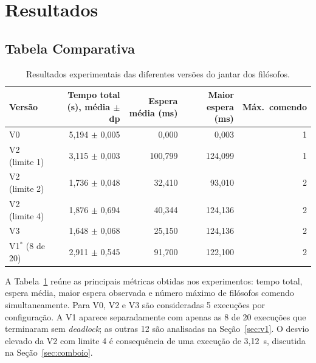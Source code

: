 \documentclass[12pt,brazil,a4paper]{article}
\begin{document}
\section{Resultados}

\subsection{Tabela Comparativa}

\begin{table}[H]
\centering
\small
\begin{tabular}{lrrrr}
\toprule
Versão & Tempo total (s), média $\pm$ dp & Espera média (ms) & Maior espera (ms) & Máx.\ comendo\\
\midrule
V0 & 5,194 $\pm$ 0,005 & 0,000 & 0,003 & 1\\
V2 (limite 1) & 3,115 $\pm$ 0,003 & 100,799 & 124,099 & 1\\
V2 (limite 2) & 1,736 $\pm$ 0,048 & 32,410 & 93,010 & 2\\
V2 (limite 4) & 1,876 $\pm$ 0,694 & 40,344 & 124,136 & 2\\
V3 & 1,648 $\pm$ 0,068 & 25,150 & 124,136 & 2\\
\midrule
V1$^*$ (8 de 20) & 2,911 $\pm$ 0,545 & 91,700 & 122,100 & 2\\
\bottomrule
\end{tabular}
\caption{Resultados experimentais das diferentes versões do jantar dos filósofos.}
\label{tab:resultados-gerais}
\end{table}

A Tabela~\ref{tab:resultados-gerais} reúne as principais métricas obtidas nos experimentos: tempo total, espera média, maior espera observada e número máximo de filósofos comendo simultaneamente. Para V0, V2 e V3 são consideradas 5 execuções por configuração. A V1 aparece separadamente com apenas as 8 de 20 execuções que terminaram sem \textit{deadlock}; as outras 12 são analisadas na Seção~\ref{sec:v1}. O desvio elevado da V2 com limite 4 é consequência de uma execução de 3,12~s, discutida na Seção~\ref{sec:comboio}.
\end{document}
